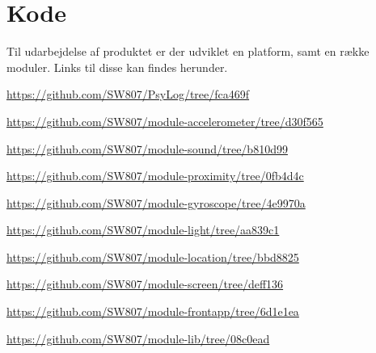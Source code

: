 \chapter{Kode}
Til udarbejdelse af produktet er der udviklet en platform, samt en række moduler.
Links til disse kan findes herunder.

\begin{description}[style=nextline]
	\item[PsyLog] \url{https://github.com/SW807/PsyLog/tree/fca469f}
	\item[module-accelerometer] \url{https://github.com/SW807/module-accelerometer/tree/d30f565}
	\item[module-sound] \url{https://github.com/SW807/module-sound/tree/b810d99}
	\item[module-proximity] \url{https://github.com/SW807/module-proximity/tree/0fb4d4c}
	\item[module-gyroscope] \url{https://github.com/SW807/module-gyroscope/tree/4e9970a}
	\item[module-light] \url{https://github.com/SW807/module-light/tree/aa839c1}
	\item[module-location] \url{https://github.com/SW807/module-location/tree/bbd8825}
	\item[module-screen] \url{https://github.com/SW807/module-screen/tree/deff136}
	\item[module-frontapp] \url{https://github.com/SW807/module-frontapp/tree/6d1e1ea}
	\item[module-lib] \url{https://github.com/SW807/module-lib/tree/08c0ead}
\end{description}